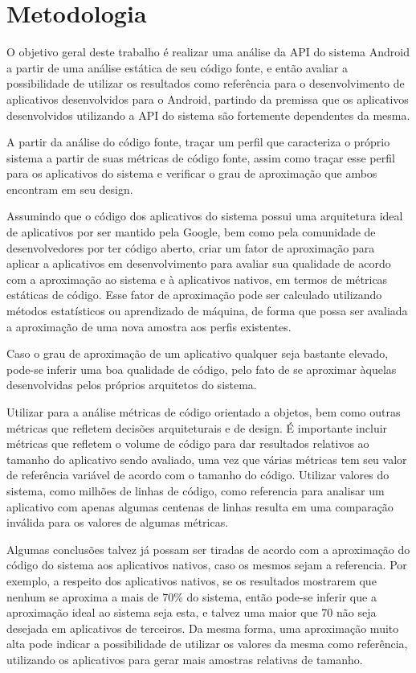\chapter{Metodologia}

O objetivo geral deste trabalho é realizar uma análise da API do sistema Android a partir de uma análise estática de seu código fonte, e então avaliar a possibilidade de utilizar os resultados como referência para o desenvolvimento de aplicativos desenvolvidos para o Android, partindo da premissa que os aplicativos desenvolvidos utilizando a API do sistema são fortemente dependentes da mesma.

A partir da análise do código fonte, traçar um perfil que caracteriza o próprio sistema a partir de suas métricas de código fonte, assim como traçar esse perfil para os aplicativos do sistema e verificar o grau de aproximação que ambos encontram em seu design. 

Assumindo que o código dos aplicativos do sistema possui uma arquitetura ideal de aplicativos por ser mantido pela Google, bem como pela comunidade de desenvolvedores por ter código aberto, criar um fator de aproximação para aplicar a aplicativos em desenvolvimento para avaliar sua qualidade de acordo com a aproximação ao sistema e à aplicativos nativos, em termos de métricas estáticas de código. Esse fator de aproximação pode ser calculado utilizando métodos estatísticos ou aprendizado de máquina, de forma que possa ser avaliada a aproximação de uma nova amostra aos perfis existentes.

Caso o grau de aproximação de um aplicativo qualquer seja bastante elevado, pode-se inferir uma boa qualidade de código, pelo fato de se aproximar àquelas desenvolvidas pelos próprios arquitetos do sistema.

Utilizar para a análise métricas de código orientado a objetos, bem como outras métricas que refletem decisões arquiteturais e de design. É importante incluir métricas que refletem o volume de código para dar resultados relativos ao tamanho do aplicativo sendo avaliado, uma vez que várias métricas tem seu valor de referência variável de acordo com o tamanho do código. Utilizar valores do sistema, como milhões de linhas de código, como referencia para analisar um aplicativo com apenas algumas centenas de linhas resulta em uma comparação inválida para os valores de algumas métricas.

Algumas conclusões talvez já possam ser tiradas de acordo com a aproximação do código do sistema aos aplicativos nativos, caso os mesmos sejam a referencia. Por exemplo, a respeito dos aplicativos nativos, se os resultados mostrarem que nenhum se aproxima a mais de 70\% do sistema, então pode-se inferir que a aproximação ideal ao sistema seja esta, e talvez uma maior que 70 não seja desejada em aplicativos de terceiros. Da mesma forma, uma aproximação muito alta pode indicar a possibilidade de utilizar os valores da mesma como referência, utilizando os aplicativos para gerar mais amostras relativas de tamanho.

